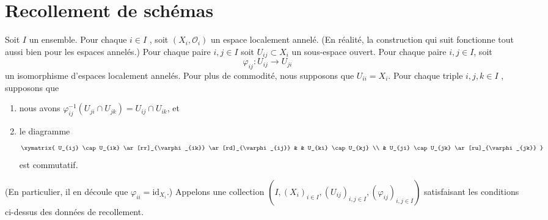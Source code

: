\section{Recollement de schémas}
\label{section-glueing-schemes}

\noindent
Soit  $I$  un ensemble. Pour chaque  $i \in I$ , soit  $(X_i, \mathcal{O}_i)$  un
espace localement annelé. (En réalité, la construction qui suit fonctionne tout
aussi bien pour les espaces annelés.) Pour chaque paire  $i, j \in I$  soit
 $U_{ij} \subset X_i$  un sous-espace ouvert. Pour chaque paire  $i, j \in I$, soit
$$
\varphi_{ij} : U_{ij} \to U_{ji}
$$
un isomorphisme d'espaces localement annelés. Pour plus de commodité, nous
supposons que  $U_{ii} = X_i$. Pour chaque triple  $i, j, k \in I$ , supposons que
\begin{enumerate}
\item nous avons  $\varphi_{ij}^{-1}(U_{ji} \cap U_{jk}) =  U_{ij} \cap U_{ik}$, et
\item le diagramme
$$
\xymatrix{
U_{ij} \cap U_{ik} \ar[rr]_{\varphi_{ik}} \ar[rd]_{\varphi_{ij}} & &
U_{ki} \cap U_{kj} \\
& U_{ji} \cap U_{jk} \ar[ru]_{\varphi_{jk}}
}
$$
est commutatif.
\end{enumerate}
(En particulier, il en découle que  $\varphi_{ii} = \text{id}_{X_i}$.) Appelons une collection
 $(I, (X_i)_{i\in I}, (U_{ij})_{i, j\in I}, (\varphi_{ij})_{i, j\in I})$  satisfaisant les conditions ci-dessus des données de recollement.

